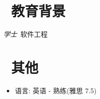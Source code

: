 \documentclass{resume}
\begin{document}
\section{\faGraduationCap\  教育背景}
\textit{学士}\ 软件工程

\section{\faInfo\ 其他}
\begin{itemize}[parsep=0.5ex]
  \item 语言: 英语 - 熟练(雅思 7.5)
\end{itemize}

%
%
\end{document}
